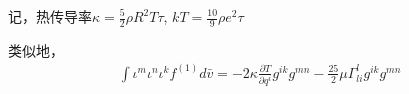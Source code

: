 \documentclass[LBMDerivation.tex]{subfiles}
\begin{document}
记，热传导率$\kappa=\frac{5}{2}\rho R^2 T \tau$, $kT=\frac{10}{9}\rho e^2 \tau$


类似地，
\begin{equation}
  \begin{gathered}
    \int \iota^m \iota^n  \iota^{k} f^{(1)}  d \bar{v}  = -2\kappa \frac{\partial T}{\partial q^i} g^{ik} g^{mn}- \frac{25}{2}\mu \Gamma_{li}^{l}g^{ik} g^{mn}
  \end{gathered}
\end{equation}















\end{document}
